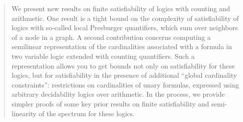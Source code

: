 \begin{abstract}
We present new results on finite satisfiability of logics with counting and arithmetic.
One result is a tight bound on the complexity of satisfiability of logics with so-called local Presburger quantifiers, which sum over neighbors of a node in a graph. A second contribution concerns computing a semilinear representation of the cardinalities associated with a formula in two variable logic extended with counting quantifiers. Such a representation allows you to get bounds not only on satisfiability for these logics, but for satisfiability in the presence of additional ``global cardinality constraints'': restrictions on cardinalities of unary formulas, expressed using arbitrary decidability logics over arithmetic.
In the process, we provide simpler proofs of some key prior  results on finite satisfiability and semi-linearity of the spectrum for these  logics.
\end{abstract}